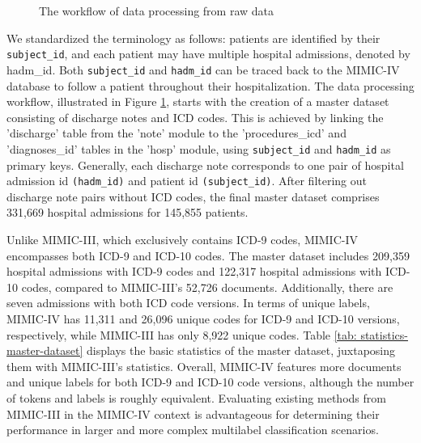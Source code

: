 \documentclass[11pt]{article}
\begin{document}
\begin{figure}[t!]
\centering
{}
\caption{\small The workflow of data processing from raw data }
\label{fig:Data processing workflow}
\end{figure}
We standardized the terminology as follows: patients are identified by their \texttt{subject\_id}, and each patient may have multiple hospital admissions, denoted by hadm\_id. Both \texttt{subject\_id} and \texttt{hadm\_id} can be traced back to the MIMIC-IV database to follow a patient throughout their hospitalization. The data processing workflow, illustrated in Figure \ref{fig:Data processing workflow}, starts with the creation of a master dataset consisting of discharge notes and ICD codes. This is achieved by linking the 'discharge' table from the 'note' module to the 'procedures\_icd' and 'diagnoses\_id' tables in the 'hosp' module, using \texttt{subject\_id} and \texttt{hadm\_id} as primary keys. Generally, each discharge note corresponds to one pair of hospital admission id \texttt{(hadm\_id)} and patient id \texttt{(subject\_id)}. After filtering out discharge note pairs without ICD codes, the final master dataset comprises 331,669 hospital admissions for 145,855 patients.

Unlike MIMIC-III, which exclusively contains ICD-9 codes, MIMIC-IV encompasses both ICD-9 and ICD-10 codes. The master dataset includes 209,359 hospital admissions with ICD-9 codes and 122,317 hospital admissions with ICD-10 codes, compared to MIMIC-III's 52,726 documents. Additionally, there are seven admissions with both ICD code versions. In terms of unique labels, MIMIC-IV has 11,311 and 26,096 unique codes for ICD-9 and ICD-10 versions, respectively, while MIMIC-III has only 8,922 unique codes. Table \ref{tab: statistics-master-dataset} displays the basic statistics of the master dataset, juxtaposing them with MIMIC-III's statistics. Overall, MIMIC-IV features more documents and unique labels for both ICD-9 and ICD-10 code versions, although the number of tokens and labels is roughly equivalent. Evaluating existing methods from MIMIC-III in the MIMIC-IV context is advantageous for determining their performance in larger and more complex multilabel classification scenarios.
\end{document}
